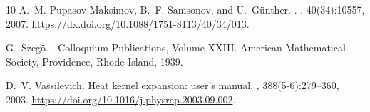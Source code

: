 \documentclass[12pt]{article}
\begin{document}
\begin{thebibliography}{10}
A.~M. Pupasov-Maksimov, B.~F. Samsonov, and U.~G\"unther.
.
,
  40(34):10557, 2007.
\newblock \url{https://dx.doi.org/10.1088/1751-8113/40/34/013}.

G.~Szeg\"o.
.
\newblock Colloquium Publications, Volume XXIII. American Mathematical Society,
  Providence, Rhode Island, 1939.

D.~V. Vassilevich.
\newblock Heat kernel expansion: user's manual.
, 388(5-6):279--360, 2003.
\newblock \url{https://doi.org/10.1016/j.physrep.2003.09.002}.

\end{thebibliography}
\end{document}
